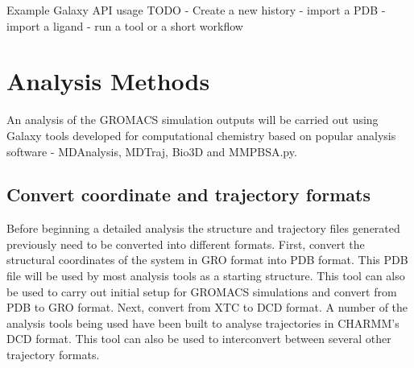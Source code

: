 \documentclass[twocolumn]{bmcart}%
\begin{document}
\begin{handson_box_colour}{Example Galaxy API usage}
TODO
- Create a new history
- import a PDB
- import a ligand
- run a tool or a short workflow
\end{handson_box_colour}


\hypertarget{analysis}{%
\section*{Analysis Methods}\label{analysis}}

An analysis of the GROMACS simulation outputs will be carried out using Galaxy tools developed for computational chemistry\cite{senapathi_biomolecular_2019} based on popular analysis software - MDAnalysis\cite{michaudagrawal_mdanalysis_2011}, MDTraj\cite{mcgibbon_mdtraj_2015}, Bio3D\cite{skjaerven_integrating_2014} and MMPBSA.py\cite{miller_mmpbsa}. 



\hypertarget{create-pdb-file-needed-by-most-analysis-tools}{%
\subsection*{Convert coordinate and trajectory formats}\label{create-pdb-file-needed-by-most-analysis-tools}}

Before beginning a detailed analysis the structure and trajectory files generated previously need to be converted into different formats. First, convert the structural coordinates of the system in GRO format into PDB format. This PDB file will be used by most analysis tools as a starting structure. This tool can also be used to carry out initial setup for GROMACS simulations and convert from PDB to GRO format. Next, convert from XTC to DCD format. A number of the analysis tools being used have been built to analyse trajectories in CHARMM's DCD format. This tool can also be used to interconvert between several other trajectory formats. 
\end{document}
